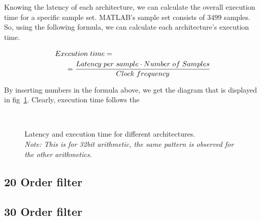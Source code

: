 Knowing the latency of each architecture, we can calculate the overall execution time for a specific sample set. MATLAB's sample set consists of $3499$ samples. So, using the following formula, we can calculate each architecture's execution time.
\begin{small}
\begin{equation}
	\centering
	\begin{split}
		Execution\hspace{3pt} time &= \\
		& \hspace{-55pt} =\frac{{Latency \hspace{3pt} per \hspace{3pt} sample}\cdot{Number \hspace{3pt} of \hspace{3pt} Samples}}{{Clock \hspace{3pt} frequency}}
	\end{split}
\end{equation}
\end{small}
By inserting numbers in the formula above, we get the diagram that is displayed in fig~\ref{fig:exec_time_latency_min_32}. Clearly, execution time follows the 

\begin{figure}[htpb]
	\centering
	\\
	\caption{Latency and execution time for different architectures.\\ \textit{Note: This is for 32bit arithmetic, the same pattern is observed for the other arithmetics.}}
	\label{fig:exec_time_latency_min_32}
\end{figure}

\subsection{20 Order filter}

\subsection{30 Order filter}
